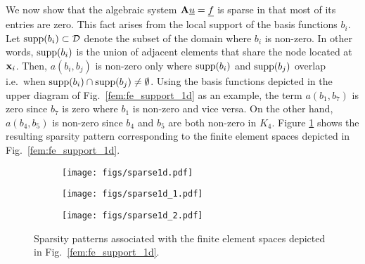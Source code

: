 \documentclass[../doc.tex]{subfiles}
\begin{document}
We now show that the algebraic system $\boldsymbol{\mathrm{A}}\underline{u} = \underline{f}$ is sparse in that most of its entries are zero. This fact arises from the local support of the basis functions $b_i$. Let $\operatorname{supp}(b_i) \subset \mathcal{D}$ denote the subset of the domain where $b_i$ is non-zero. In other words, $\operatorname{supp}(b_i)$ is the union of adjacent elements that share the node located at $\boldsymbol{\mathrm{x}}_i$. Then, $a(b_i, b_j)$ is non-zero only where $\operatorname{supp}(b_i)$ and $\operatorname{supp}(b_j)$ overlap i.e.~when $\operatorname{supp}(b_i) \cap \operatorname{supp}(b_j) \neq \emptyset$. Using the basis functions depicted in the upper diagram of Fig.~\ref{fem:fe_support_1d} as an example, the term $a(b_1,b_7)$ is zero since $b_7$ is zero where $b_1$ is non-zero and vice versa. On the other hand, $a(b_4,b_5)$ is non-zero since $b_4$ and $b_5$ are both non-zero in $K_4$. Figure \ref{fem:sparse1d} shows the resulting sparsity pattern corresponding to the finite element spaces depicted in Fig.~\ref{fem:fe_support_1d}. 
\begin{figure}
\centering
\begin{subfigure}{.32\textwidth}
	\centering
	\texttt{[image: figs/sparse1d.pdf]}
	\caption{}
\end{subfigure}
\begin{subfigure}{.32\textwidth}
	\centering
	\texttt{[image: figs/sparse1d\_1.pdf]}
	\caption{}
\end{subfigure}
\begin{subfigure}{.32\textwidth}
	\centering
	\texttt{[image: figs/sparse1d\_2.pdf]}
	\caption{}
\end{subfigure}
\caption{Sparsity patterns associated with the finite element spaces depicted in Fig.~\ref{fem:fe_support_1d}. }
\label{fem:sparse1d}
\end{figure}

\subsection{}
\end{document}
